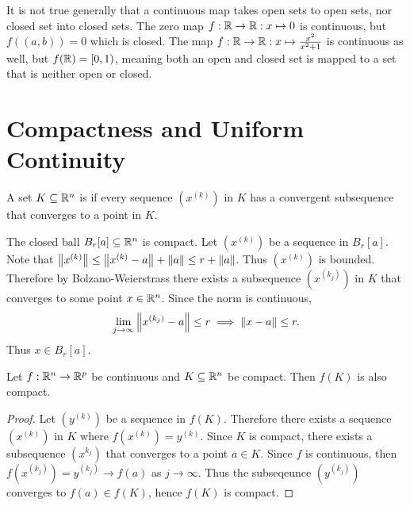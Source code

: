 \documentclass[../main.tex]{subfiles}
\begin{document}
\begin{remark}
    It is not true generally that a continuous map takes open sets to open sets, nor closed set into closed sets. The zero map $f : \mathbb{R} \to \mathbb{R} : x \mapsto 0$ is continuous, but $f((a,b)) = \qty{0}$ which is closed. The map $f : \mathbb{R} \to \mathbb{R} : x \mapsto \frac{x^2}{x^2 + 1}$ is continuous as well, but $f(\mathbb{R}) = [0, 1)$, meaning both an open and closed set is mapped to a set that is neither open or closed.
\end{remark}

\section[Compactness]{Compactness and Uniform Continuity}

\begin{definition}
    A set $K \subseteq \mathbb{R}^n$ is  if every sequence $(x^{(k)})$ in $K$ has a convergent subsequence that converges to a point in $K$.
\end{definition}

\begin{example}
    The closed ball $B_r[a] \subseteq \mathbb{R}^n$ is compact. Let $(x^{(k)})$ be a sequence in $B_r[a]$. Note that $\norm{x^{(k)}} \leq \norm{x^{(k)} - a} + \norm{a} \leq r + \norm{a}$. Thus $(x^{(k)})$ is bounded. Therefore by Bolzano-Weierstrass there exists a subsequence $(x^{(k_j)})$ in $K$ that converges to some point $x \in \mathbb{R}^n$. Since the norm is continuous,
    \[
        \lim_{j \to \infty} \norm{x^{(k_j)} - a} \leq r \implies \norm{x - a} \leq r
    .\]
    Thus $x \in B_r[a]$.
\end{example}

\begin{theorem}
    Let $f : \mathbb{R}^n \to \mathbb{R}^p$ be continuous and $K \subseteq \mathbb{R}^n$ be compact. Then $f(K)$ is also compact.
\end{theorem}

\begin{proof}
    Let $(y^{(k)})$ be a sequence in $f(K)$. Therefore there exists a sequence $(x^{(k)})$ in $K$ where $f(x^{(k)}) = y^{(k)}$. Since $K$ is compact, there exists a subsequence $(x^{k_j})$ that converges to a point $a \in K$. Since $f$ is continuous, then $f(x^{(k_j)}) = y^{(k_j)} \to f(a)$ as $j \to \infty$. Thus the subseqeunce $(y^{(k_j)})$ converges to $f(a) \in f(K)$, hence $f(K)$ is compact.
\end{proof}
\end{document}
